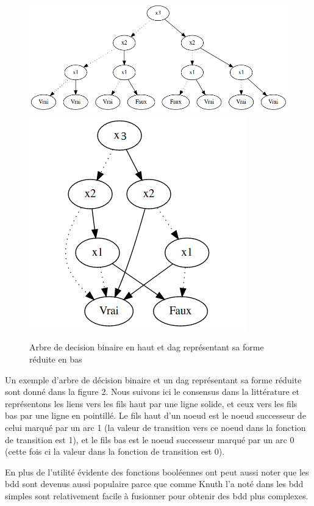\documentclass[french]{article}
\begin{document}
\begin{figure}[h!]
    \centering
    \includegraphics[scale=0.4]{bdd ex1.png}
    \includegraphics[scale=0.4]{robdd ex1.png}
    \caption{Arbre de decision binaire en haut et dag représentant sa forme réduite en bas}
    \label{fig:ROBDD1}
\end{figure}

Un exemple d'arbre de décision binaire et un dag représentant sa forme réduite sont donné dans la figure 2. Nous suivons ici le consensus dans la littérature et représentons les liens vers les fils haut par une ligne solide, et ceux vers les fils bas par une ligne en pointillé. Le fils haut d'un noeud est le noeud successeur de celui marqué par un arc 1 (la valeur de transition vers ce noeud dans la fonction de transition est 1), et le fils bas est le noeud successeur marqué par un arc 0 (cette fois ci la valeur dans la fonction de transition est 0).\medskip

En plus de l'utilité évidente des fonctions booléennes ont peut aussi noter que les bdd sont devenus aussi populaire parce que comme Knuth l'a noté dans \cite{knuth} les bdd simples sont relativement facile à fusionner pour obtenir des bdd plus complexes.\medskip
\end{document}
